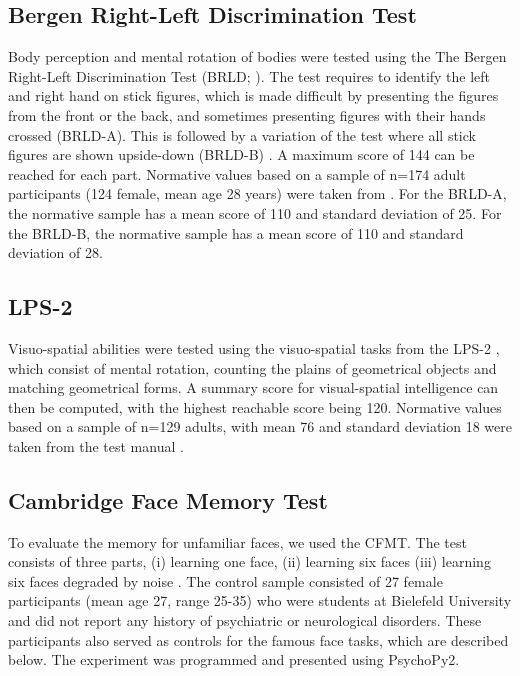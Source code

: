 \documentclass[fleqn,10pt]{SelfArx} %
\begin{document}
\subsection*{Bergen Right-Left Discrimination Test}
Body perception and mental rotation of bodies were tested using the The Bergen Right-Left Discrimination Test (BRLD; \citet{Ofte_2002}). The test requires to identify the left and right hand on stick figures, which is made difficult by presenting the figures from the front or the back, and sometimes presenting figures with their hands crossed (BRLD-A). This is followed by a variation of the test where all stick figures are shown upside-down (BRLD-B) \citep{Grewe_2014}. A maximum score of 144 can be reached for each part. Normative values based on a sample of n=174 adult participants (124 female, mean age 28 years) were taken from \citep{Grewe_2014}. For the BRLD-A, the normative sample has a mean score of 110 and standard deviation of 25. For the BRLD-B, the normative sample has a mean score of 110 and standard deviation of 28.

\subsection*{LPS-2}
Visuo-spatial abilities were tested using the visuo-spatial tasks from the LPS-2 \citep{Horn}, which consist of mental rotation, counting the plains of geometrical objects and matching geometrical forms. A summary score for visual-spatial intelligence can then be computed, with the highest reachable score being 120. Normative values based on a sample of n=129 adults, with mean 76 and standard deviation 18 were taken from the test manual \citep{Horn}.

\subsection*{Cambridge Face Memory Test}
To evaluate the memory for unfamiliar faces, we used the CFMT. The test consists of three parts, (i) learning one face, (ii) learning six faces (iii) learning six faces degraded by noise \citep{Duchaine_2006cfmt}. The control sample consisted of 27 female participants (mean age 27, range 25-35) who were students at Bielefeld University and did not report any history of psychiatric or neurological disorders. These participants also served as controls for the famous face tasks, which are described below. The experiment was programmed and presented using PsychoPy2.
\end{document}

